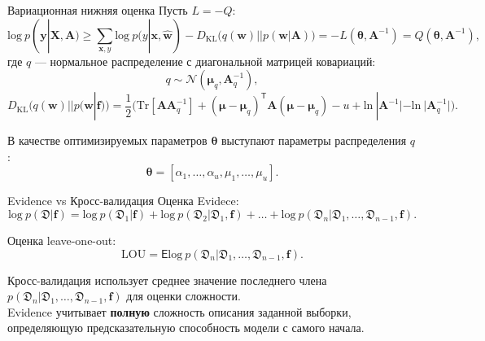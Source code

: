 \documentclass[10pt,pdf,utf8,russian,aspectratio=169]{beamer}
\begin{document}
\begin{frame}{Вариационная нижняя оценка}
Пусть $L=-Q$:
\[
\label{eq:elbo}
\text{log}~p(\mathbf{y}|\mathbf{X},\mathbf{A})  
\geq 
\sum_{\mathbf{x},y} \text{log}~p({y}|\mathbf{x}, \hat{\mathbf{w}}) - D_\text{KL}\bigl(q (\mathbf{w}) || p (\mathbf{w}|\mathbf{A})\bigr) = -L(\boldsymbol{\theta}, \mathbf{A}^{-1}) = Q(\boldsymbol{\theta}, \mathbf{A}^{-1}),
\]
где $q$ --- нормальное распределение с диагональной матрицей ковариаций:
\[
\label{eq:diag}
	q \sim \mathcal{N}(\boldsymbol{\mu}_q, \mathbf{A}^{-1}_q),
\]
$$
D_\text{KL}\bigl(q (\mathbf{w}) || p (\mathbf{w}|\mathbf{f})\bigr) = \frac{1}{2} \bigl( \text{Tr} [\mathbf{A}\mathbf{A}^{-1}_q] + (\boldsymbol{\mu} - \boldsymbol{\mu}_q)^\mathsf{T}\mathbf{A}(\boldsymbol{\mu} - \boldsymbol{\mu}_q) - u +\text{ln}~|\mathbf{A}^{-1}| - \text{ln}~|\mathbf{A}_q^{-1}| \bigr).
$$

В качестве оптимизируемых параметров $\boldsymbol{\theta}$ выступают параметры распределения $q$:
\[
\boldsymbol{\theta} = [\alpha_1, \dots, \alpha_u, {\mu}_1,\dots,{\mu}_u].
\]

\end{frame}


\begin{frame}{Evidence vs Кросс-валидация}
Оценка Evidece:
\[
\text{log}~p(\mathfrak{D}|\mathbf{f}) = \text{log}~p(\mathfrak{D}_1|\mathbf{f}) + \text{log}~p(\mathfrak{D}_2|\mathfrak{D}_1, \mathbf{f}) + \dots +  \text{log}~p(\mathfrak{D}_n|\mathfrak{D}_1,\dots,\mathfrak{D}_{n-1}, \mathbf{f}).
\]

Оценка leave-one-out:
\[
\text{LOU} = \mathsf{E} \text{log}~p(\mathfrak{D}_n|\mathfrak{D}_1,\dots,\mathfrak{D}_{n-1}, \mathbf{f}).
\]

Кросс-валидация использует среднее значение последнего члена $p(\mathfrak{D}_n|\mathfrak{D}_1,\dots,\mathfrak{D}_{n-1}, \mathbf{f})$ для оценки сложности. \\
Evidence учитывает \textbf{полную} сложность описания заданной выборки, определяющую предсказательную способность модели с самого начала.
\end{frame}
\end{document}
